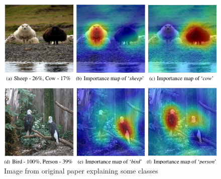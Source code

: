 \begin{figure}[H]
\centering
\includegraphics[width=12cm]{chapters/02_methods/images/rise/sheep.png}
\caption{Image from original paper explaining some classes}
\label{rise_example}
\end{figure}

